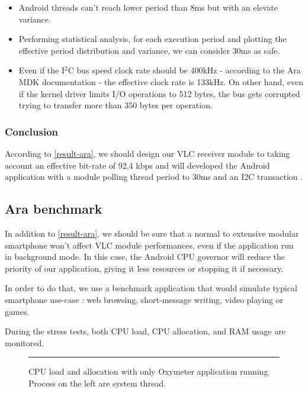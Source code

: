 \begin{itemize}
\item Android threads can't reach lower period than 8ms but with an elevate variance.

\item Performing statistical analysis, for each execution period and plotting the effective period distribution and variance, we can consider 30ms as safe.

\item Even if the I$^2$C bus speed clock rate should be 400kHz - according to the Ara MDK documentation - the effective clock rate is 133kHz.
On other hand, even if the kernel driver limits I/O operations to 512 bytes, the bus gets corrupted trying to transfer more than 350 bytes per operation.
\end{itemize}

\subsubsection{Conclusion}  \label{conclusion-ara}
According to \ref{result-ara}, we should design our VLC receiver module to taking account an effective bit-rate of 92,4 kbps and will developed the Android application with a module polling thread period to 30ms and an I2C transaction . 


\subsection{Ara benchmark}

In addition to \ref{result-ara}, we should be sure that a normal to extensive modular smartphone won't affect VLC module performances, even if the application run in background mode. In this case, the Android CPU governor will reduce the priority of our application, giving it less resources or stopping it if necessary.

In order to do that, we use a benchmark application that would simulate typical smartphone use-case : web browsing, short-message writing, video playing or games.

During the stress tests, both CPU load, CPU allocation, and RAM usage are monitored.

\begin{figure}[htbp]
    \label{fig:cpu-single}
    \rule{35em}{0.5pt}
    \caption{CPU load and allocation with only Oxymeter application running. Process on the left are system thread.}
\end{figure}


